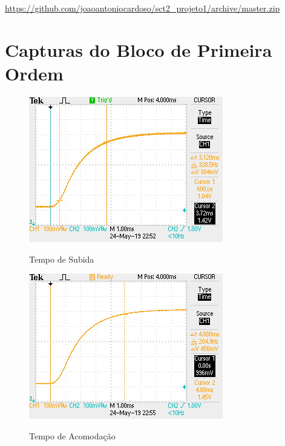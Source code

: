 \documentclass[
	12pt,				%
	article,			%
	openright,			%
	oneside,
	a4paper,			%
	chapter=TITLE,		%
	section=TITLE,		%
	english,			%
	french,				%
	spanish,			%
	brazil,				%
]{abntex2}
\begin{document}
\begin{apendicesenv}
            \url{https://github.com/joaoantoniocardoso/sct2_projeto1/archive/master.zip}
            
        \clearpage
	
    	\chapter{Capturas do Bloco de Primeira Ordem}
        	\label{ap-block1}
        	
        	\FloatBarrier
        	\begin{figure}[htbp]
            	\centering
            	\caption{Tempo de Subida}
            	\includegraphics[width=\textwidth,height=240px,keepaspectratio]{imgs/block1/rise_time.JPG}
            	\label{fig-block1-rise_time}
        	\end{figure}			
        
        	\begin{figure}[htbp]
            	\centering
            	\caption{Tempo de Acomodação}
            	\includegraphics[width=\textwidth,height=240px,keepaspectratio]{imgs/block1/settling_time.JPG}
            	\label{fig-block1-settling_time}
        	\end{figure}
        	

\end{apendicesenv}
\end{document}
